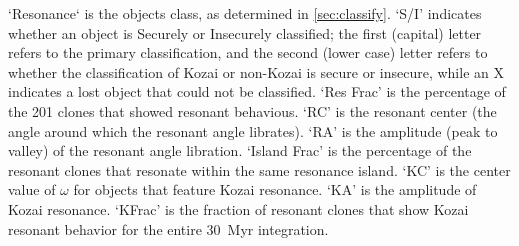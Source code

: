 \begin{longrotatetable}
{`Resonance` is the objects class, as determined in \autoref{sec:classify}.
`S/I' indicates whether an object is Securely or Insecurely classified; the first (capital) letter refers to the primary classification, and the second (lower case) letter refers to whether the classification of Kozai or non-Kozai is secure or insecure, while an X indicates a lost object that could not be classified.
`Res Frac' is the percentage of the 201 clones that showed resonant behavious.
`RC' is the resonant center (the angle around which the resonant angle librates).
`RA' is the amplitude (peak to valley) of the resonant angle libration.
`Island Frac' is the percentage of the resonant clones that resonate within the same resonance island.
`KC' is the center value of $\omega$ for objects that feature Kozai resonance.
`KA' is the amplitude of Kozai resonance.
`KFrac' is the fraction of resonant clones that show Kozai resonant behavior for the entire 30~Myr integration. 
}
\end{longrotatetable}